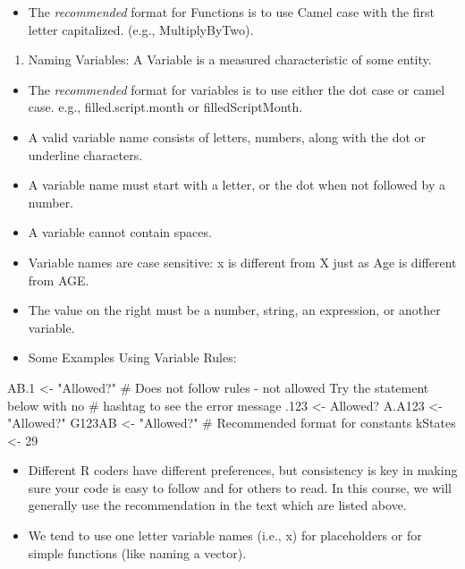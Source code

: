 \documentclass[
  letterpaper,
  DIV=11,
  numbers=noendperiod]{scrreprt}
\newenvironment{Shaded}{\begin{snugshade}}{\end{snugshade}}
\newcommand{\CommentTok}[1]{\textcolor[rgb]{0.37,0.37,0.37}{#1}}
\newcommand{\DecValTok}[1]{\textcolor[rgb]{0.68,0.00,0.00}{#1}}
\newcommand{\FloatTok}[1]{\textcolor[rgb]{0.68,0.00,0.00}{#1}}
\newcommand{\NormalTok}[1]{\textcolor[rgb]{0.00,0.23,0.31}{#1}}
\newcommand{\OtherTok}[1]{\textcolor[rgb]{0.00,0.23,0.31}{#1}}
\newcommand{\StringTok}[1]{\textcolor[rgb]{0.13,0.47,0.30}{#1}}
\providecommand{\tightlist}{%
  \setlength{\itemsep}{0pt}\setlength{\parskip}{0pt}}\usepackage{longtable,booktabs,array}
\begin{document}
\begin{itemize}
\tightlist
\item
  The \emph{recommended} format for Functions is to use Camel case with
  the first letter capitalized. (e.g., MultiplyByTwo).
\end{itemize}

\begin{enumerate}
\def\labelenumi{\arabic{enumi}.}
\setcounter{enumi}{2}
\tightlist
\item
  Naming Variables: A Variable is a measured characteristic of some
  entity.
\end{enumerate}

\begin{itemize}
\item
  The \emph{recommended} format for variables is to use either the dot
  case or camel case. e.g., filled.script.month or filledScriptMonth.
\item
  A valid variable name consists of letters, numbers, along with the dot
  or underline characters.
\item
  A variable name must start with a letter, or the dot when not followed
  by a number.
\item
  A variable cannot contain spaces.
\item
  Variable names are case sensitive: x is different from X just as Age
  is different from AGE.
\item
  The value on the right must be a number, string, an expression, or
  another variable.
\item
  Some Examples Using Variable Rules:
\end{itemize}

\begin{Shaded}
\begin{Highlighting}[]
\NormalTok{AB}\FloatTok{.1} \OtherTok{\textless{}{-}} \StringTok{"Allowed?"}
\CommentTok{\# Does not follow rules {-} not allowed Try the statement below with no}
\CommentTok{\# hashtag to see the error message .123 \textless{}{-} \textquotesingle{}Allowed?\textquotesingle{}}
\NormalTok{A.A123 }\OtherTok{\textless{}{-}} \StringTok{"Allowed?"}
\NormalTok{G123AB }\OtherTok{\textless{}{-}} \StringTok{"Allowed?"}
\CommentTok{\# Recommended format for constants}
\NormalTok{kStates }\OtherTok{\textless{}{-}} \DecValTok{29}
\end{Highlighting}
\end{Shaded}

\begin{itemize}
\tightlist
\item
  Different R coders have different preferences, but consistency is key
  in making sure your code is easy to follow and for others to read. In
  this course, we will generally use the recommendation in the text
  which are listed above.
\item
  We tend to use one letter variable names (i.e., x) for placeholders or
  for simple functions (like naming a vector).
\end{itemize}
\end{document}
